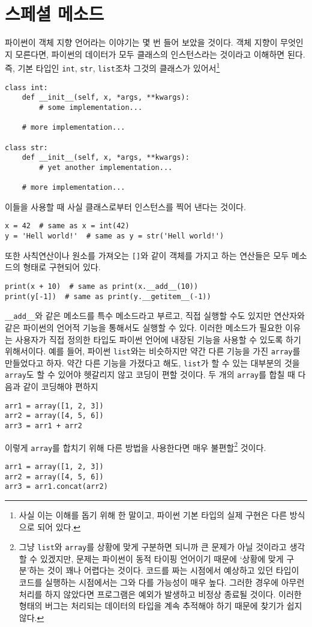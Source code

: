 \documentclass{scrartcl}
\begin{document}
\section{스페셜 메소드}
파이썬이 객체 지향 언어라는 이야기는 몇 번 들어 보았을 것이다. 객체 지향이 무엇인지 모른다면, 파이썬의 데이터가 모두 클래스의 인스턴스라는 것이라고 이해하면 된다. 즉, 기본 타입인 \texttt{int}, \texttt{str}, \texttt{list}조차 그것의 클래스가 있어서\footnote{사실 이는 이해를 돕기 위해 한 말이고, 파이썬 기본 타입의 실제 구현은 다른 방식으로 되어 있다.}
\begin{lstlisting}
class int:
    def __init__(self, x, *args, **kwargs):
        # some implementation...

    # more implementation...

class str:
    def __init__(self, x, *args, **kwargs):
        # yet another implementation...

    # more implementation...
\end{lstlisting}
이들을 사용할 때 사실 클래스로부터 인스턴스를 찍어 낸다는 것이다.
\begin{lstlisting}
x = 42  # same as x = int(42)
y = 'Hell world!'  # same as y = str('Hell world!')
\end{lstlisting}
또한 사칙연산이나 원소를 가져오는 \texttt{[]}와 같이 객체를 가지고 하는 연산들은 모두 메소드의 형태로 구현되어 있다.
\begin{lstlisting}
print(x + 10)  # same as print(x.__add__(10))
print(y[-1])  # same as print(y.__getitem__(-1))
\end{lstlisting}
\texttt{\_\_add\_\_}와 같은 메소드를 특수 메소드라고 부르고, 직접 실행할 수도 있지만 연산자와 같은 파이썬의 언어적 기능을 통해서도 실행할 수 있다. 이러한 메소드가 필요한 이유는 사용자가 직접 정의한 타입도 파이썬 언어에 내장된 기능을 사용할 수 있도록 하기 위해서이다. 예를 들어, 파이썬 \texttt{list}와는 비슷하지만 약간 다른 기능을 가진 \texttt{array}를 만들었다고 하자. 약간 다른 기능을 가졌다고 해도, \texttt{list}가 할 수 있는 대부분의 것을 \texttt{array}도 할 수 있어야 헷갈리지 않고 코딩이 편할 것이다. 두 개의 \texttt{array}를 합칠 때 다음과 같이 코딩해야 편하지
\begin{lstlisting}
arr1 = array([1, 2, 3])
arr2 = array([4, 5, 6])
arr3 = arr1 + arr2
\end{lstlisting}
이렇게 \texttt{array}를 합치기 위해 다른 방법을 사용한다면 매우 불편할\footnote{그냥 \texttt{list}와 \texttt{array}를 상황에 맞게 구분하면 되니까 큰 문제가 아닐 것이라고 생각할 수 있겠지만, 문제는 파이썬이 동적 타이핑 언어이기 때문에 `상황에 맞게 구분'하는 것이 꽤나 어렵다는 것이다. 코드를 짜는 시점에서 예상하고 있던 타입이 코드를 실행하는 시점에서는 그와 다를 가능성이 매우 높다. 그러한 경우에 아무런 처리를 하지 않았다면 프로그램은 예외가 발생하고 비정상 종료될 것이다. 이러한 형태의 버그는 처리되는 데이터의 타입을 계속 추적해야 하기 때문에 찾기가 쉽지 않다.} 것이다.
\begin{lstlisting}
arr1 = array([1, 2, 3])
arr2 = array([4, 5, 6])
arr3 = arr1.concat(arr2)
\end{lstlisting}
\end{document}
